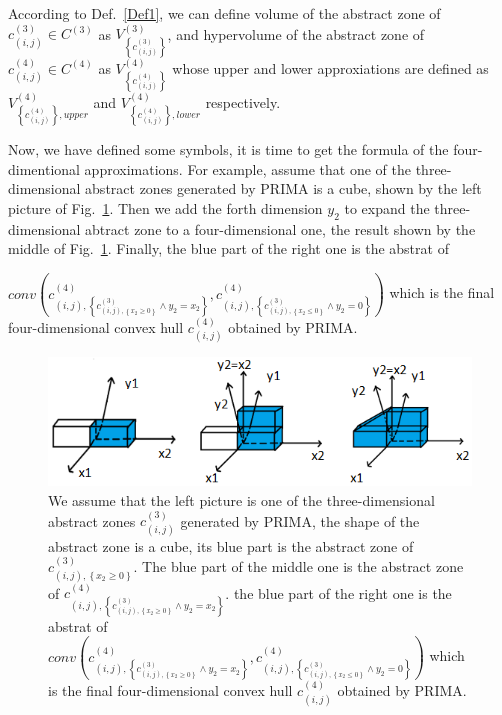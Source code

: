 \documentclass[runningheads]{llncs}
\begin{document}
\begin{definition}\label{Def2}
According to Def.~\ref{Def1}, we can define volume of the abstract zone of $c_{\left ( i,j\right )}^{(3)}\in C^{(3)}$ as $V_{\left \{c_{(i,j)}^{(3)} \right \}}^{(3)}$, and hypervolume of the abstract zone of $c_{\left ( i,j\right )}^{(4)}\in C^{(4)}$ as  $V_{\left \{c_{(i,j)}^{(4)} \right \}}^{(4)}$ whose upper and  lower approxiations are defined as $V_{\left \{c_{(i,j)}^{(4)} \right \},upper}^{(4)}$ and $V_{\left \{c_{(i,j)}^{(4)} \right \},lower}^{(4)}$ respectively.
\end{definition}


Now, we have defined some symbols, it is time to get the formula of the four-dimentional approximations. For example, assume that one of the three-dimensional abstract zones generated by PRIMA is a cube, shown by the left picture of Fig.~\ref{fig3}. Then we add the forth dimension $y_{2}$ to expand the three-dimensional abtract zone to a four-dimensional one, the result shown by the middle of Fig.~\ref{fig3}. Finally, the blue part of the right one is the abstrat of 
\par $conv(c_{\left ( i,j\right ),\left \{ c^{(3)}_{\left ( i,j\right ),\left \{x_{2}\geq 0\right \}}\wedge y_{2}=x_{2}\right \}}^{(4)},c_{\left ( i,j\right ),\left \{ c^{(3)}_{\left ( i,j\right ),\left \{x_{2}\leq 0\right \}}\wedge y_{2}=0\right \}}^{(4)})$ which is the final four-dimensional convex hull $c_{(i,j)}^{(4)}$ obtained by PRIMA.
\begin{figure}
\includegraphics[width=\textwidth]{Fig/FigR2_1.png}
\caption{We assume that the left picture is one of the three-dimensional abstract zones $c^{(3)}_{( i,j)}$ generated by PRIMA, the shape of the abstract zone is a cube, its blue part is the abstract zone of $c^{(3)}_{\left ( i,j\right ),\left \{x_{2}\geq 0\right \}}$.
The blue part of the middle one is the abstract zone of $c_{\left ( i,j\right ),\left \{ c^{(3)}_{\left ( i,j\right ),\left \{x_{2}\geq 0\right \}}\wedge y_{2}=x_{2}\right \}}^{(4)}$. the blue part of the right one is the abstrat of $conv(c_{\left ( i,j\right ),\left \{ c^{(3)}_{\left ( i,j\right ),\left \{x_{2}\geq 0\right \}}\wedge y_{2}=x_{2}\right \}}^{(4)},c_{\left ( i,j\right ),\left \{ c^{(3)}_{\left ( i,j\right ),\left \{x_{2}\leq 0\right \}}\wedge y_{2}=0\right \}}^{(4)})$ which is the final four-dimensional convex hull $c_{(i,j)}^{(4)}$ obtained by PRIMA.} \label{fig3}
\end{figure}
\end{document}
